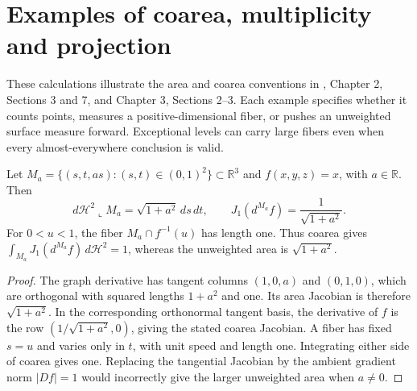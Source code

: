 \chapter{Examples of coarea, multiplicity and projection}\label{sec:examples-coarea-projections}
These calculations illustrate the area and coarea conventions in \cite{Sim18}, Chapter 2, Sections 3 and 7, and Chapter 3, Sections 2--3. Each example specifies whether it counts points, measures a positive-dimensional fiber, or pushes an unweighted surface measure forward. Exceptional levels can carry large fibers even when every almost-everywhere conclusion is valid.

\begin{example}\label{ex:coarea-tilted-plane}
Let $M_a=\{(s,t,as):(s,t)\in(0,1)^2\}\subset\mathbb R^3$ and $f(x,y,z)=x$, with $a\in\mathbb R$. Then
\[
 d\mathcal H^2\llcorner M_a=\sqrt{1+a^2}\,ds\,dt,
 \qquad J_1(d^{M_a}f)=\frac1{\sqrt{1+a^2}}.
\]
For $0<u<1$, the fiber $M_a\cap f^{-1}(u)$ has length one. Thus coarea gives $\int_{M_a}J_1(d^{M_a}f)\,d\mathcal H^2=1$, whereas the unweighted area is $\sqrt{1+a^2}$.
\end{example}
\begin{proof}
The graph derivative has tangent columns $(1,0,a)$ and $(0,1,0)$, which are orthogonal with squared lengths $1+a^2$ and one. Its area Jacobian is therefore $\sqrt{1+a^2}$. In the corresponding orthonormal tangent basis, the derivative of $f$ is the row $(1/\sqrt{1+a^2},0)$, giving the stated coarea Jacobian. A fiber has fixed $s=u$ and varies only in $t$, with unit speed and length one. Integrating either side of coarea gives one. Replacing the tangential Jacobian by the ambient gradient norm $|Df|=1$ would incorrectly give the larger unweighted area when $a\ne0$.
\end{proof}

